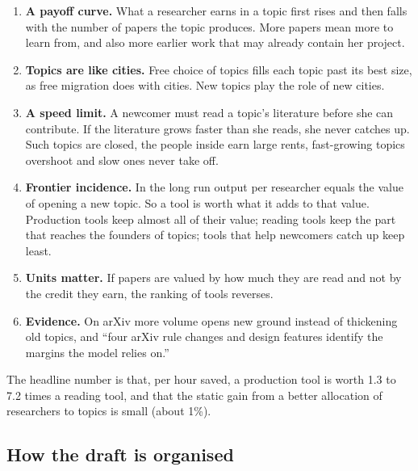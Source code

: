 \begin{enumerate}
\item \textbf{A payoff curve.} What a researcher earns in a topic first rises and then falls with the number of papers the topic produces. More papers mean more to learn from, and also more earlier work that may already contain her project.
\item \textbf{Topics are like cities.} Free choice of topics fills each topic past its best size, as free migration does with cities. New topics play the role of new cities.
\item \textbf{A speed limit.} A newcomer must read a topic's literature before she can contribute. If the literature grows faster than she reads, she never catches up. Such topics are closed, the people inside earn large rents, fast-growing topics overshoot and slow ones never take off.
\item \textbf{Frontier incidence.} In the long run output per researcher equals the value of opening a new topic. So a tool is worth what it adds to that value. Production tools keep almost all of their value; reading tools keep the part that reaches the founders of topics; tools that help newcomers catch up keep least.
\item \textbf{Units matter.} If papers are valued by how much they are read and not by the credit they earn, the ranking of tools reverses.
\item \textbf{Evidence.} On arXiv more volume opens new ground instead of thickening old topics, and ``four arXiv rule changes and design features identify the margins the model relies on.''
\end{enumerate}

The headline number is that, per hour saved, a production tool is worth 1.3 to 7.2 times a reading tool, and that the static gain from a better allocation of researchers to topics is small (about 1\%).

\subsection{How the draft is organised}

